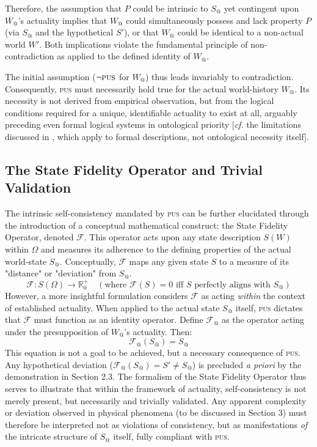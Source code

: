 \documentclass[11pt, a4paper]{article}
\makeatletter
\newcommand{\pus}{\textsc{pus}} %
\newcommand{\Wactual}{W_{@}} %
\newcommand{\Sactual}{S_{@}} %
\newcommand{\Omegaset}{\Omega} %
\newcommand{\FidelityOp}{\mathcal{F}} %
\newcommand{\FidelityOpActual}{\mathcal{F}_{@}} %
\makeatother
\begin{document}
Therefore, the assumption that $P$ could be intrinsic to $\Sactual$ yet contingent upon $\Wactual$'s actuality implies that $\Wactual$ could simultaneously possess and lack property $P$ (via $\Sactual$ and the hypothetical $S'$), or that $\Wactual$ could be identical to a non-actual world $W'$. Both implications violate the fundamental principle of non-contradiction as applied to the defined identity of $\Wactual$.

The initial assumption ($\neg \pus$ for $\Wactual$) thus leads invariably to contradiction. Consequently, \pus{} must necessarily hold true for the actual world-history $\Wactual$. Its necessity is not derived from empirical observation, but from the logical conditions required for a unique, identifiable actuality to exist at all, arguably preceding even formal logical systems in ontological priority [\textit{cf.} the limitations discussed in \citealp{godel1931}, which apply to formal descriptions, not ontological necessity itself].

\subsection{The State Fidelity Operator and Trivial Validation}
The intrinsic self-consistency mandated by \pus{} can be further elucidated through the introduction of a conceptual mathematical construct: the State Fidelity Operator, denoted $\FidelityOp$. This operator acts upon any state description $S(W)$ within $\Omegaset$ and measures its adherence to the defining properties of the actual world-state $\Sactual$. Conceptually, $\FidelityOp$ maps any given state $S$ to a measure of its "distance" or "deviation" from $\Sactual$.
\[
\FidelityOp: S(\Omegaset) \rightarrow \mathbb{R}^{+}_{0} \quad (\text{where } \FidelityOp(S) = 0 \text{ iff } S \text{ perfectly aligns with } \Sactual)
\]
However, a more insightful formulation considers $\FidelityOp$ as acting \textit{within} the context of established actuality. When applied to the actual state $\Sactual$ itself, \pus{} dictates that $\FidelityOp$ must function as an identity operator. Define $\FidelityOpActual$ as the operator acting under the presupposition of $\Wactual$'s actuality. Then:
\begin{equation}
\FidelityOpActual(\Sactual) = \Sactual
\label{eq:fidelity}
\end{equation}
This equation is not a goal to be achieved, but a necessary consequence of \pus. Any hypothetical deviation ($\FidelityOpActual(\Sactual) = S' \neq \Sactual$) is precluded \textit{a priori} by the demonstration in Section 2.3. The formalism of the State Fidelity Operator thus serves to illustrate that within the framework of actuality, self-consistency is not merely present, but necessarily and trivially validated. Any apparent complexity or deviation observed in physical phenomena (to be discussed in Section 3) must therefore be interpreted not as violations of consistency, but as manifestations \textit{of} the intricate structure of $\Sactual$ itself, fully compliant with \pus.
\end{document}
